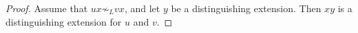 

\setcounter{section}{4}
\setcounter{subsection}{1}
\setcounter{dfn}{6}

\begin{proof}
Assume that $ux \not\sim_L vx$, and let $y$ be a distinguishing extension.
Then $xy$ is a distinguishing extension for $u$ and $v$.
\end{proof}





